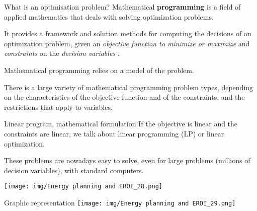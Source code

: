 \begin{frame}{What is an optimisation problem?}
\label{what-is-an-optimisation-problem}
Mathematical \textbf{programming} is a field of applied mathematics that
deals with solving optimization problems.

It provides a framework and solution methods for computing the decisions
of an optimization problem, given an \emph{objective function to
minimize or maximize} and \emph{constraints} on the \emph{decision
variables} .

Mathematical programming relies on a model of the problem.

There is a large variety of mathematical programming problem types,
depending on the characteristics of the objective function and of the
constraints, and the restrictions that apply to variables.
\end{frame}

\begin{frame}{Linear program, mathematical formulation}
\label{linear-program-mathematical-formulation}
If the objective is linear and the constraints are linear, we talk about
linear programming (LP) or linear optimization.

These problems are nowadays easy to solve, even for large problems
(millions of decision variables), with standard computers.

\texttt{[image: img/Energy planning and EROI\_28.png]}
\end{frame}

\begin{frame}{Graphic representation}
\label{graphic-representation}
\texttt{[image: img/Energy planning and EROI\_29.png]}
\end{frame}

